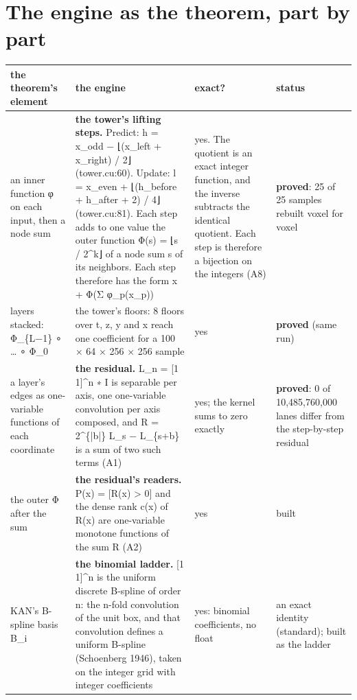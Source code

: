 \section{\texorpdfstring{The engine as the theorem, part by part}{The engine as the theorem, part by part}}

{\footnotesize
\setlength{\tabcolsep}{6pt}
\begin{longtable}{>{\RaggedRight\arraybackslash}p{}>{\RaggedRight\arraybackslash}p{}>{\RaggedRight\arraybackslash}p{}>{\RaggedRight\arraybackslash}p{}}
\toprule
the theorem's element & the engine & exact? & status \\
\midrule
\endhead
an inner function φ on each input, then a node sum & \textbf{the tower's lifting steps.} Predict: h = x\_\allowbreak{}odd − ⌊(x\_\allowbreak{}left + x\_\allowbreak{}right) / 2⌋ (tower.cu:60). Update: l = x\_\allowbreak{}even + ⌊(h\_\allowbreak{}before + h\_\allowbreak{}after + 2) / 4⌋ (tower.cu:81). Each step adds to one value the outer function Φ(s) = ⌊s / 2\textasciicircum{}k⌋ of a node sum s of its neighbors. Each step therefore has the form x + Φ(Σ φ\_\allowbreak{}p(x\_\allowbreak{}p)) & yes. The quotient is an exact integer function, and the inverse subtracts the identical quotient. Each step is therefore a bijection on the integers (A8) & \textbf{proved}: 25 of 25 samples rebuilt voxel for voxel \\
layers stacked: Φ\_\allowbreak{}\{L−1\} ∘ … ∘ Φ\_\allowbreak{}0 & the tower's floors: 8 floors over t, z, y and x reach one coefficient for a 100 × 64 × 256 × 256 sample & yes & \textbf{proved} (same run) \\
a layer's edges as one-variable functions of each coordinate & \textbf{the residual.} L\_\allowbreak{}n = [1 1]\textasciicircum{}n ∗ I is separable per axis, one one-variable convolution per axis composed, and R = 2\textasciicircum{}\{|b|\} L\_\allowbreak{}s − L\_\allowbreak{}\{s+b\} is a sum of two such terms (A1) & yes; the kernel sums to zero exactly & \textbf{proved}: 0 of 10,485,760,000 lanes differ from the step-by-step residual \\
the outer Φ after the sum & \textbf{the residual's readers.} P(x) = [R(x) > 0] and the dense rank c(x) of R(x) are one-variable monotone functions of the sum R (A2) & yes & built \\
KAN's B-spline basis B\_\allowbreak{}i & \textbf{the binomial ladder.} [1 1]\textasciicircum{}n is the uniform discrete B-spline of order n: the n-fold convolution of the unit box, and that convolution defines a uniform B-spline (Schoenberg 1946), taken on the integer grid with integer coefficients & yes: binomial coefficients, no float & an exact identity (standard); built as the ladder \\

\end{longtable}}
